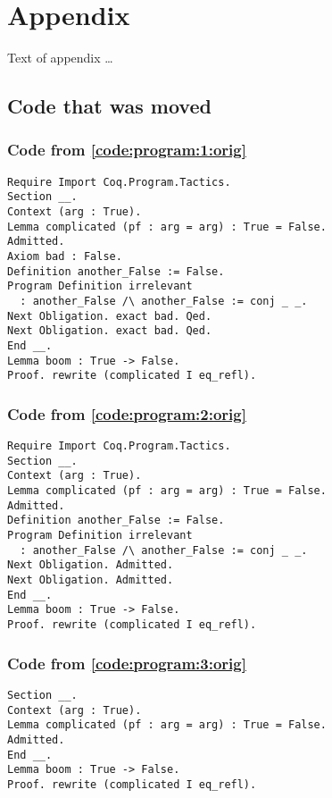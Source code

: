 \documentclass[a4paper,USenglish,cleveref,autoref,thm-restate]{lipics-v2021}
\begin{document}



\appendix
\section{Appendix}

Text of appendix \ldots

\subsection{Code that was moved}

\subsubsection{Code from \autoref{code:program:1:orig}}\label{code:program:1}
\begin{verbatim}
Require Import Coq.Program.Tactics.
Section __.
Context (arg : True).
Lemma complicated (pf : arg = arg) : True = False.
Admitted.
Axiom bad : False.
Definition another_False := False.
Program Definition irrelevant
  : another_False /\ another_False := conj _ _.
Next Obligation. exact bad. Qed.
Next Obligation. exact bad. Qed.
End __.
Lemma boom : True -> False.
Proof. rewrite (complicated I eq_refl).
\end{verbatim}
\subsubsection{Code from \autoref{code:program:2:orig}}\label{code:program:2}
\begin{verbatim}
Require Import Coq.Program.Tactics.
Section __.
Context (arg : True).
Lemma complicated (pf : arg = arg) : True = False.
Admitted.
Definition another_False := False.
Program Definition irrelevant
  : another_False /\ another_False := conj _ _.
Next Obligation. Admitted.
Next Obligation. Admitted.
End __.
Lemma boom : True -> False.
Proof. rewrite (complicated I eq_refl).
\end{verbatim}

\subsubsection{Code from \autoref{code:program:3:orig}}\label{code:program:3}
\begin{verbatim}
Section __.
Context (arg : True).
Lemma complicated (pf : arg = arg) : True = False.
Admitted.
End __.
Lemma boom : True -> False.
Proof. rewrite (complicated I eq_refl).
\end{verbatim}
\end{document}
